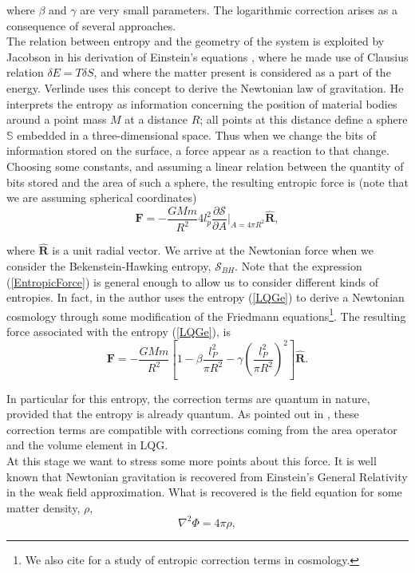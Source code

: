 \documentclass[nofootinbib,aps,prd,preprint,groupedaddress,showpacs,showkeys]{revtex4-1}
\begin{document}
\noindent where $\beta$ and $\gamma$ are very small parameters. The logarithmic correction arises as a consequence of several approaches.\\
\indent The relation between entropy and the geometry of the system is exploited by Jacobson in his derivation of Einstein's equations \cite{Jacobson1}, where he made use of Clausius relation $\delta E = T \delta S$, and where the matter present is considered as a part of the energy. Verlinde \cite{Verlinde} uses this concept to derive the Newtonian law of gravitation. He interprets the entropy as information concerning the position of material bodies around a point mass $M$ at a distance $R$; all points at this distance define a sphere $\mathbb{S}$ embedded in a three-dimensional space. Thus when we change the bits of information stored on the surface, a force appear as a reaction to that change. Choosing some constants, and assuming a linear relation between the quantity of bits stored and the area of such a sphere, the resulting entropic force is (note that we are assuming spherical coordinates)
\begin{equation}
\mathbf{F} = - \frac{GMm}{R^2} 4 l_p^2 \frac{\partial \mathcal{S}}{\partial A} \Big|_{A = 4 \pi R^2} \hat{\mathbf{R}}, \label{EntropicForce}
\end{equation}

\noindent where $\hat{\mathbf{R}}$ is a unit radial vector. We arrive at the Newtonian force when we consider the Bekenstein-Hawking entropy, $\mathcal{S}_{BH}$. Note that the expression (\ref{EntropicForce}) is general enough to allow us to consider different kinds of entropies. In fact, in \cite{Sheykhi} the author uses the entropy (\ref{LQGe}) to derive a Newtonian cosmology through some modification of the Friedmann equations\footnote{We also cite \cite{Frampton} for a study of entropic correction terms in cosmology.}. The resulting force associated with the entropy (\ref{LQGe}), is
\begin{equation}
\mathbf{F} = - \frac{GMm}{R^2} \left[ 1 - \beta \frac{l_P^2}{\pi R^2} - \gamma \left( \frac{l_P^2}{\pi R^2} \right)^{2} \right] \hat{\mathbf{R}}. \label{LQGForce}
\end{equation}

\noindent In particular for this entropy, the correction terms are quantum in nature, provided that the entropy is already quantum. As pointed out in \cite{ModestoRandono}, these correction terms are compatible with corrections coming from the area operator and the volume element in LQG.\\
\indent At this stage we want to stress some more points about this force. It is well known that Newtonian gravitation is recovered from Einstein's General Relativity in the weak field approximation. What is recovered is the field equation for some matter density, $\rho$,
\begin{equation}
\nabla^2 \Phi = 4 \pi \rho, \label{FieldEq}
\end{equation}
\end{document}
